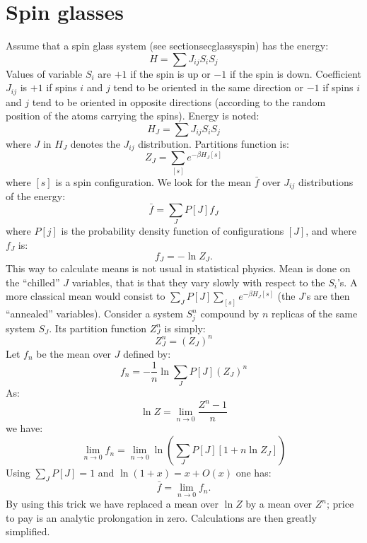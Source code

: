 \documentclass[12pt]{book}
\begin{document}
\section{Spin glasses}\label{secverredespi}
Assume that a spin glass system (see
section{secglassyspin}) has the energy: 
\begin{equation}
H=\sum J_{ij}S_iS_j
\end{equation}
Values of variable $S_i$ are $+1$ if the spin is up or $-1$ if the spin is
down. Coefficient $J_{ij}$ is $+1$ if spins $i$ and $j$ tend to be oriented in
the same direction or $-1$ if spins $i$ and $j$ tend to be oriented in
opposite directions (according to the random position of the atoms carrying
the spins). Energy is noted:
\begin{equation}
H_J=\sum J_{ij}S_iS_j
\end{equation}
where $J$ in $H_J$ denotes the $J_{ij}$ distribution. Partitions function is: 
\begin{equation}
Z_J=\sum_{[s]}e^{-\beta H_J[s]}
\end{equation}
where $[s]$ is a spin configuration. We look for the mean $\bar f$ over
$J_{ij}$ distributions of the energy:
\begin{equation}
\bar f=\sum_JP[J]f_J
\end{equation}
where $P[j]$ is the probability density function of configurations $[J]$, and where $f_J$ is:
\begin{equation}
f_J=-\ln Z_J.
\end{equation}
This way to calculate means is not usual in statistical physics. Mean is done
on the ``chilled'' $J$ variables, that is that they vary slowly with respect
to the $S_i$'s. A more classical mean would consist to $\sum_J
P[J]\sum_{[s]}e^{-\beta H_J[s]}$ (the $J$'s are then ``annealed'' variables).
Consider a system $S_j^n$ compound by  $n$ replicas of the
same system $S_J$. Its partition function $Z_J^n$ is simply:
\begin{equation}
Z_J^n=(Z_J)^n
\end{equation}
Let $f_n$ be the mean over $J$ defined by:
\begin{equation}
f_n=-\frac{1}{n}\ln \sum_J P[J](Z_J)^n
\end{equation}
As:
\begin{equation}
\ln Z=\lim_{n\rightarrow 0}\frac{Z^n-1}{n}
\end{equation}
we have:
\begin{equation}
\lim_{n\rightarrow 0}f_n=\lim_{n\rightarrow 0}\ln (\sum_J P[J][1+n \ln Z_J])
\end{equation}
Using $\sum_JP[J]=1$ and $\ln(1+x)=x+O(x)$ one has:
\begin{equation}
\bar f=\lim_{n\rightarrow 0}f_n.
\end{equation}
By using this trick we have replaced a mean over $\ln Z$ by a mean over $Z^n$;
price to pay is an analytic prolongation in zero. Calculations are then
greatly simplified\cite{ph:sping:Mezard87}.
\end{document}
